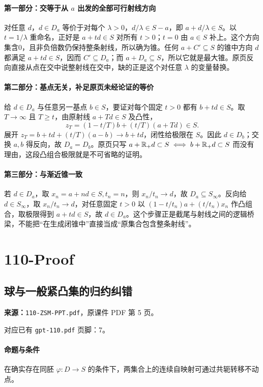 \paragraph{第一部分：交等于从 $a$ 出发的全部可行射线方向}
对任意 $d$，$d\in D_a$ 等价于对每个 $\lambda>0$，$d/\lambda\in S-a$，即 $a+d/\lambda\in S$。以 $t=1/\lambda$ 重命名，正好是 $a+td\in S$ 对所有 $t>0$；$t=0$ 由 $a\in S$ 补上。这个方向集含0，且非负倍数仍保持整条射线，所以确为锥。任何 $a+C'\subseteq S$ 的锥中方向 $d$ 都满足 $a+td\in S$，因而 $C'\subseteq D_a$；而 $a+D_a\subseteq S$，所以它就是最大锥。原页反向直接从点在交中说整射线在交中，缺的正是这个对任意 $\lambda$ 的变量替换。
\paragraph{第二部分：基点无关，补足原页未经论证的等价}
给 $d\in D_a$ 与任意另一基点 $b\in S$，要证对每个固定 $t>0$ 都有 $b+td\in S$。取 $T\to\infty$ 且 $T\ge t$，由原射线 $a+Td\in S$ 及凸性，
\[z_T=(1-t/T)b+(t/T)(a+Td)\in S.\]
展开 $z_T=b+td+(t/T)(a-b)\to b+td$，闭性给极限在 $S$。因此 $d\in D_b$；交换 $a,b$ 得反向，故 $D_a=D_b$。原页只写 $a+\mathbb{R}_+d\subset S\iff b+\mathbb{R}_+d\subset S$ 而没有理由，这段凸组合极限就是不可省略的证明。
\paragraph{第三部分：与渐近锥一致}
若 $d\in D_a$，取 $x_n=a+nd\in S,t_n=n$，则 $x_n/t_n\to d$，故 $D_a\subseteq S_\infty$。反向给 $d\in S_\infty$，取 $x_n/t_n\to d$，对任意固定 $t>0$ 以 $(1-t/t_n)a+(t/t_n)x_n$ 作凸组合，取极限得到 $a+td\in S$，故 $d\in D_a$。这个步骤正是截尾与射线之间的逻辑桥梁，不能把“在生成闭锥中”直接当成“原集合包含整条射线”。

\clearpage\section{110-Proof}
\clearpage\subsection{球与一般紧凸集的归约纠错}
\textbf{来源：}\texttt{110-ZSM-PPT.pdf}，原课件 PDF 第 5 页。\par
对应已有 \texttt{gpt-110.pdf} 页脚：7。\par
\paragraph{命题与条件}在确实存在同胚 $\varphi:D\to S$ 的条件下，两集合上的连续自映射可通过共轭转移不动点。
